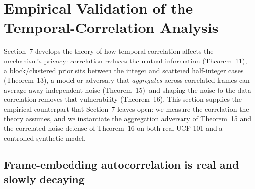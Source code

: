 
\section{Empirical Validation of the Temporal-Correlation Analysis}
\label{sec:corr_experiments}

Section~7 develops the theory of how temporal correlation affects the
mechanism's privacy: correlation reduces the mutual information
(Theorem~11), a block/clustered prior sits between the integer and
scattered half-integer cases (Theorem~13), a model or adversary that
\emph{aggregates} across correlated frames can average away independent
noise (Theorem~15), and shaping the noise to the data correlation removes
that vulnerability (Theorem~16). This section supplies the empirical
counterpart that Section~7 leaves open: we measure the correlation the
theory assumes, and we instantiate the aggregation adversary of
Theorem~15 and the correlated-noise defense of Theorem~16 on both real
UCF-101 and a controlled synthetic model.

\subsection{Frame-embedding autocorrelation is real and slowly decaying}
\label{subsec:autocorr}

